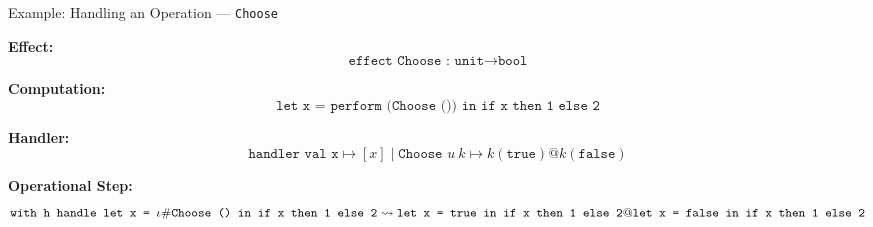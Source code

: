 \begin{frame}{Example: Handling an Operation — \texttt{Choose}}

\textbf{Effect:}
\[
\texttt{effect Choose : unit} \rightarrow \texttt{bool}
\]

\textbf{Computation:}
\[
\texttt{let x = perform (Choose ()) in if x then 1 else 2}
\]

\textbf{Handler:}
\[
\texttt{handler val x} \mapsto [x] \mid
\texttt{Choose } u\ k \mapsto k(\texttt{true}) @ k(\texttt{false})
\]

\textbf{Operational Step:}
\[
\texttt{with h handle let x = } \iota \# \texttt{Choose () in if x then 1 else 2} 
\rightsquigarrow \\
\texttt{let x = true in if x then 1 else 2} @
\texttt{let x = false in if x then 1 else 2}
\]

\end{frame}




